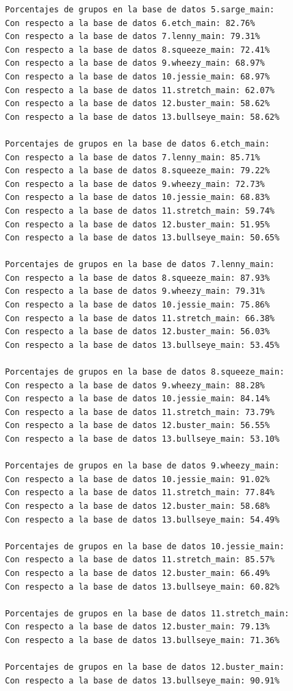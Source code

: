 \documentclass[a4paper, 12pt]{book}
\begin{document}
\begin{verbatim}
		Porcentajes de grupos en la base de datos 5.sarge_main:
		Con respecto a la base de datos 6.etch_main: 82.76%
		Con respecto a la base de datos 7.lenny_main: 79.31%
		Con respecto a la base de datos 8.squeeze_main: 72.41%
		Con respecto a la base de datos 9.wheezy_main: 68.97%
		Con respecto a la base de datos 10.jessie_main: 68.97%
		Con respecto a la base de datos 11.stretch_main: 62.07%
		Con respecto a la base de datos 12.buster_main: 58.62%
		Con respecto a la base de datos 13.bullseye_main: 58.62%
		
		Porcentajes de grupos en la base de datos 6.etch_main:
		Con respecto a la base de datos 7.lenny_main: 85.71%
		Con respecto a la base de datos 8.squeeze_main: 79.22%
		Con respecto a la base de datos 9.wheezy_main: 72.73%
		Con respecto a la base de datos 10.jessie_main: 68.83%
		Con respecto a la base de datos 11.stretch_main: 59.74%
		Con respecto a la base de datos 12.buster_main: 51.95%
		Con respecto a la base de datos 13.bullseye_main: 50.65%
		
		Porcentajes de grupos en la base de datos 7.lenny_main:
		Con respecto a la base de datos 8.squeeze_main: 87.93%
		Con respecto a la base de datos 9.wheezy_main: 79.31%
		Con respecto a la base de datos 10.jessie_main: 75.86%
		Con respecto a la base de datos 11.stretch_main: 66.38%
		Con respecto a la base de datos 12.buster_main: 56.03%
		Con respecto a la base de datos 13.bullseye_main: 53.45%
		
		Porcentajes de grupos en la base de datos 8.squeeze_main:
		Con respecto a la base de datos 9.wheezy_main: 88.28%
		Con respecto a la base de datos 10.jessie_main: 84.14%
		Con respecto a la base de datos 11.stretch_main: 73.79%
		Con respecto a la base de datos 12.buster_main: 56.55%
		Con respecto a la base de datos 13.bullseye_main: 53.10%
		
		Porcentajes de grupos en la base de datos 9.wheezy_main:
		Con respecto a la base de datos 10.jessie_main: 91.02%
		Con respecto a la base de datos 11.stretch_main: 77.84%
		Con respecto a la base de datos 12.buster_main: 58.68%
		Con respecto a la base de datos 13.bullseye_main: 54.49%
		
		Porcentajes de grupos en la base de datos 10.jessie_main:
		Con respecto a la base de datos 11.stretch_main: 85.57%
		Con respecto a la base de datos 12.buster_main: 66.49%
		Con respecto a la base de datos 13.bullseye_main: 60.82%
		
		Porcentajes de grupos en la base de datos 11.stretch_main:
		Con respecto a la base de datos 12.buster_main: 79.13%
		Con respecto a la base de datos 13.bullseye_main: 71.36%
		
		Porcentajes de grupos en la base de datos 12.buster_main:
		Con respecto a la base de datos 13.bullseye_main: 90.91%

	\end{verbatim} 
	
\end{document}
